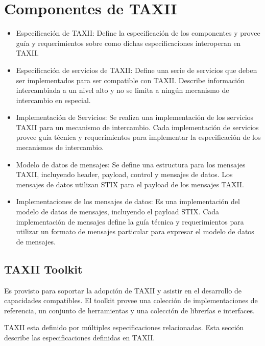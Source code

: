 \section{Componentes de TAXII}
\begin{itemize}
  \item Especificación de TAXII: Define la especificación de los componentes y 
  provee guía y requerimientos sobre como dichas especificaciones interoperan en 
  TAXII.
  \item Especificación de servicios de TAXII: Define una serie de servicios que 
  deben ser implementados para ser compatible con TAXII. Describe información 
  intercambiada a un nivel alto y no se limita a ningún mecanismo de 
  intercambio en especial.
  \item Implementación de Servicios: Se realiza una implementación de los 
  servicios TAXII para un mecanismo de intercambio. Cada implementación de 
  servicios provee guía técnica y requerimientos para implementar la 
  especificación de los mecanismos de intercambio.
  \item Modelo de datos de mensajes: Se define una estructura para los mensajes 
  TAXII, incluyendo header, payload, control y mensajes de datos. Los mensajes 
  de datos utilizan STIX para el payload de los mensajes TAXII.
  \item Implementaciones de los mensajes de datos: Es una implementación del 
  modelo de datos de mensajes, incluyendo el payload STIX.
   Cada implementación de mensajes define la guía técnica y 
  requerimientos  para utilizar un formato de mensajes particular para expresar 
  el modelo de datos de mensajes.
\end{itemize}

\subsection{TAXII Toolkit}
Es provisto para soportar la adopción de TAXII y asistir en el desarrollo de 
capacidades compatibles. El toolkit provee una colección de implementaciones de 
referencia, un conjunto de herramientas y una colección de librerías e 
interfaces.


TAXII esta definido por múltiples especificaciones relacionadas. Esta sección 
describe las especificaciones definidas en TAXII.

